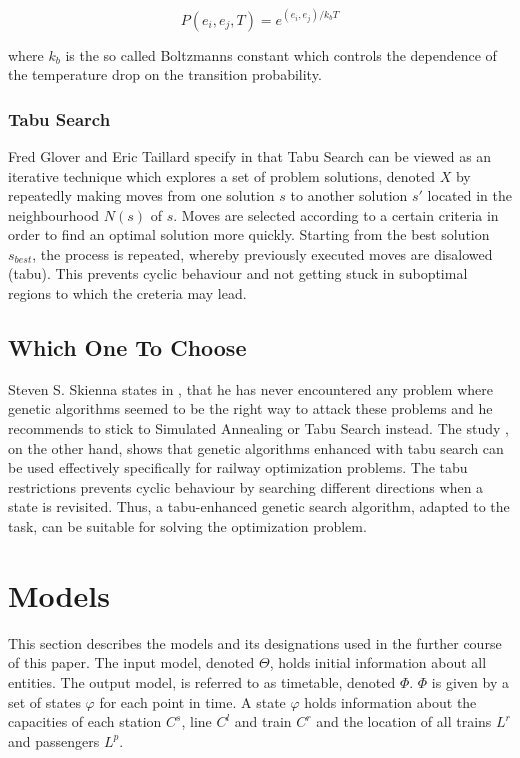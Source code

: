 \documentclass[a4paper,12pt,parskip]{article}
\begin{document}
$$
P(e_i, e_j, T) = e^{(e_i, e_j)/k_bT}
$$

where $k_b$ is the so called Boltzmanns constant which controls the dependence of 
the temperature drop on the transition probability.

\subsubsection{Tabu Search}
\label{sec:tabu}

Fred Glover and Eric Taillard specify in \cite{glover1993} that Tabu Search can 
be viewed as an iterative technique which explores a set of problem solutions,
denoted $X$ by repeatedly making moves from one solution $s$ to another solution 
$s'$ located in the neighbourhood $N(s)$ of $s$. Moves are selected according to 
a certain criteria in order to find an optimal solution more quickly. Starting from 
the best solution $s_{best}$, the process is repeated, whereby previously executed 
moves are disalowed (tabu). This prevents cyclic behaviour and not getting stuck 
in suboptimal regions to which the creteria may lead.

\subsection{Which One To Choose}

Steven S. Skienna states in \cite{skienna08}, that he has never encountered any 
problem where genetic algorithms seemed to be the right way to attack these 
problems and he recommends to stick to Simulated Annealing or Tabu Search instead. 
The study \cite{FrancisGorman1998}, on the other hand, shows that genetic 
algorithms enhanced with tabu search can be used effectively specifically for 
railway optimization problems. The tabu restrictions prevents cyclic behaviour by 
searching different directions when a state is revisited. Thus, a tabu-enhanced 
genetic search algorithm, adapted to the task, can be suitable for solving the 
optimization problem.

\section{Models}

This section describes the models and its designations used in the further course 
of this paper. The input model, denoted $\Theta$, holds initial information about 
all entities. The output model, is referred to as timetable, denoted $\Phi$. $\Phi$ 
is given by a set of states $\varphi$ for each point in time. A state $\varphi$ 
holds information about the capacities of each station $C^s$, line $C^l$ and train 
$C^r$ and the location of all trains $L^r$ and passengers $L^p$. 
\end{document}
